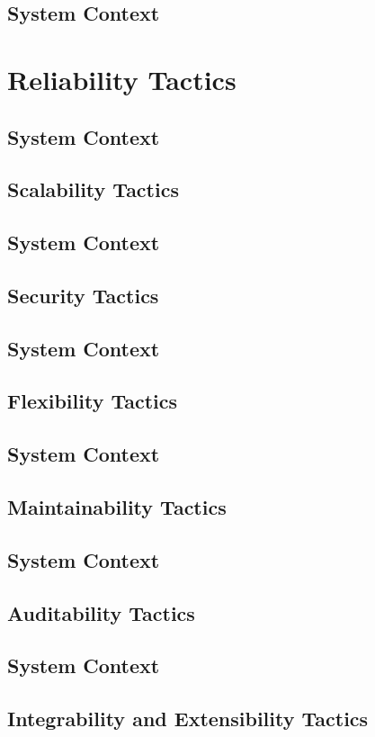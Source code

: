 \documentclass[11pt,fleqn]{book} %
\begin{document}
	\subsection{System Context}
\section{Reliability Tactics}
	\subsection{System Context}
\subsection{Scalability Tactics}
	\subsection{System Context}
\subsection{Security Tactics}
	\subsection{System Context}
\subsection{Flexibility Tactics}
	\subsection{System Context}
\subsection{Maintainability Tactics}
	\subsection{System Context}
\subsection{Auditability Tactics}
	\subsection{System Context}
\subsection{Integrability and Extensibility Tactics}
\end{document}
